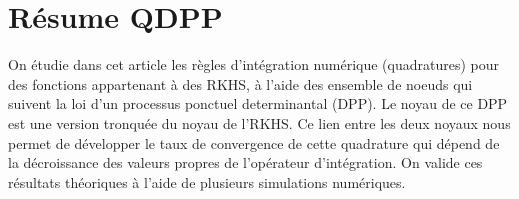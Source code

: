 \documentclass[twoside,11pt]{book}
\numberwithin{theorem}{chapter}
\numberwithin{definition}{chapter}
\numberwithin{proposition}{chapter}
\numberwithin{corollary}{chapter}
\numberwithin{example}{chapter}
\numberwithin{lemma}{chapter}
\numberwithin{assumption}{chapter}
\numberwithin{equation}{chapter}
\numberwithin{figure}{chapter}
\begin{document}
\section{Résume QDPP}
\newpage
On étudie dans cet article les règles d'intégration numérique (quadratures) pour des fonctions appartenant à des RKHS, à l'aide des ensemble de noeuds qui suivent la loi d'un processus ponctuel determinantal (DPP). Le noyau de ce DPP est une version tronquée du noyau de l'RKHS. Ce lien entre les deux noyaux nous permet de développer le taux de convergence de cette quadrature qui dépend de la décroissance des valeurs propres de l'opérateur d'intégration.
On valide ces résultats théoriques à l'aide de plusieurs simulations numériques.
\end{document}
